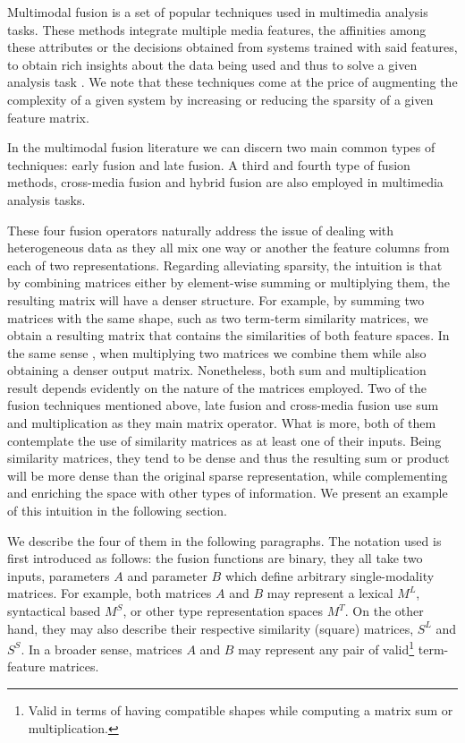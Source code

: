Multimodal fusion is a set of popular techniques used in multimedia analysis tasks. These methods integrate multiple media features, the affinities among these attributes or the decisions obtained from systems trained with said features, to obtain rich insights about the data being used and thus to solve a given analysis  task \cite{AtreyHEK10}. We note that these techniques come at the price of augmenting the complexity of a given system by increasing or reducing the sparsity of a given feature matrix.


In the multimodal fusion literature we can discern two main common types of techniques: early fusion and late fusion. A third and fourth type of fusion methods, cross-media fusion and hybrid fusion are also employed in multimedia analysis tasks. 

These four fusion operators naturally address the issue of dealing with heterogeneous data as they all mix one way or another the feature columns from each of two representations. Regarding alleviating sparsity, the intuition is that by combining matrices either by element-wise summing or multiplying them, the resulting matrix will have a denser structure. For example, by summing two matrices with the same shape, such as two term-term similarity matrices, we  obtain a resulting matrix that contains the similarities of both feature spaces. In the same sense , when multiplying two matrices we combine them while also obtaining a denser output matrix. Nonetheless, both sum and multiplication result depends evidently on the nature of the matrices employed. Two of the fusion techniques mentioned above, late fusion and cross-media fusion use sum and multiplication as they  main matrix operator. What is more, both of them contemplate the use of similarity matrices as at least one of their inputs. Being similarity matrices, they tend to be dense and thus the resulting sum or product will be more dense than the original sparse representation, while complementing and enriching the space with other types of information. We present an example of this intuition in the following section.


We describe the four of them in the following paragraphs. The notation used is first introduced as follows: the fusion functions are binary, they all take two inputs, parameters $A$ and parameter $B$ which define arbitrary single-modality matrices. For example, both matrices $A$ and $B$ may represent a lexical $M^{L}$, syntactical based $M^{S}$, or other type representation spaces $M^{T}$. On the other hand, they may also describe their  respective similarity (square) matrices, $S^{L}$ and  $S^{S}$. In a broader sense, matrices $A$ and $B$ may represent any pair of valid\footnote{Valid in terms of having compatible shapes while computing a matrix sum or multiplication.} term-feature matrices.



